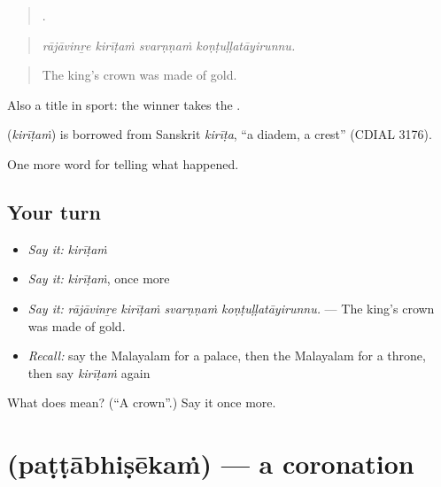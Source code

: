 \begin{quote}
   .
\end{quote}

\begin{quote}
\emph{rājāvinṟe kirīṭaṁ svarṇṇaṁ koṇṭuḷḷatāyirunnu.}
\end{quote}

\begin{quote}
The king's crown was made of gold.
\end{quote}

Also a title in sport: the winner takes the .

\begin{cousinweb}
\textbf{} (\emph{kirīṭaṁ}) is borrowed from Sanskrit \emph{kirīṭa}, \textquotedblleft{}a diadem, a crest\textquotedblright{} (CDIAL 3176).
\end{cousinweb}

\begin{grammarlens}[title={What you've built}]
One more word for telling what happened.
\end{grammarlens}

\subsection*{Your turn}
\begin{itemize}
\raggedright
  \item \emph{Say it:} \emph{kirīṭaṁ}
  \item \emph{Say it:} \emph{kirīṭaṁ}, once more
  \item \emph{Say it:} \emph{rājāvinṟe kirīṭaṁ svarṇṇaṁ koṇṭuḷḷatāyirunnu.} — The king's crown was made of gold.
  \item \emph{Recall:} say the Malayalam for a palace, then the Malayalam for a throne, then say \emph{kirīṭaṁ} again
\end{itemize}

\begin{tcolorbox}[breakable,colback=teal!4,colframe=teal!35!black,title={Before you move on}]
What does  mean? (\textquotedblleft{}A crown\textquotedblright{}.) Say it once more.
\end{tcolorbox}
\section[\texorpdfstring{\ml{പട്ടാഭിഷേകം} (paṭṭābhiṣēkaṁ)}{പട്ടാഭിഷേകം (paṭṭābhiṣēkaṁ)}]{ (paṭṭābhiṣēkaṁ) — a coronation}

